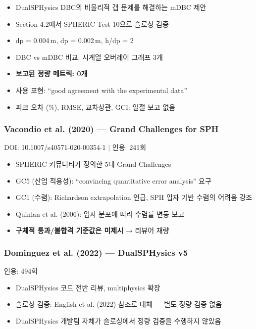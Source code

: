 \documentclass[a4paper,11pt]{article}
\begin{document}
\begin{itemize}
    \item DualSPHysics DBC의 비물리적 갭 문제를 해결하는 mDBC 제안
    \item Section 4.2에서 SPHERIC Test 10으로 슬로싱 검증
    \item dp = 0.004\,m, dp = 0.002\,m, h/dp = 2
    \item DBC vs mDBC 비교: 시계열 오버레이 그래프 3개
    \item \textbf{보고된 정량 메트릭: 0개}
    \item 사용 표현: ``good agreement with the experimental data''
    \item 피크 오차 (\%), RMSE, 교차상관, GCI: 일절 보고 없음
\end{itemize}

\subsubsection{Vacondio et al. (2020) --- Grand Challenges for SPH}

DOI: 10.1007/s40571-020-00354-1 $|$ 인용: 241회

\begin{itemize}
    \item SPHERIC 커뮤니티가 정의한 5대 Grand Challenges
    \item GC5 (산업 적용성): ``convincing quantitative error analysis'' 요구
    \item GC1 (수렴): Richardson extrapolation 언급, SPH 입자 기반 수렴의 어려움 강조
    \item Quinlan et al. (2006): 입자 분포에 따라 수렴률 변동 보고
    \item \textbf{구체적 통과/불합격 기준값은 미제시} → 리뷰어 재량
\end{itemize}

\subsubsection{Dominguez et al. (2022) --- DualSPHysics v5}

인용: 494회

\begin{itemize}
    \item DualSPHysics 코드 전반 리뷰, multiphysics 확장
    \item 슬로싱 검증: English et al. (2022) 참조로 대체 — 별도 정량 검증 없음
    \item DualSPHysics 개발팀 자체가 슬로싱에서 정량 검증을 수행하지 않았음
\end{itemize}
\end{document}
